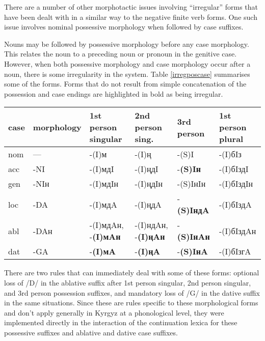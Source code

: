 \documentclass[10pt,a4paper,twocolumn]{article}
\begin{document}
There are a number of other morphotactic issues involving ``irregular'' forms that have been dealt with in a similar way to the negative finite verb forms.  One such issue involves nominal possessive morphology when followed by case suffixes.

Nouns may be followed by possessive morphology before any case morphology.  This relates the noun to a preceding noun or pronoun in the genitive case.  However, when both possessive morphology and case morphology occur after a noun, there is some irregularity in the system.  Table \ref{irregposcase} summarises some of the forms.  Forms that do not result from simple concatenation of the possession and case endings are highlighted in bold as being irregular.

\begin{table*}[htbp]
	\caption{Combinations of possessive suffixes with case suffixes}\label{irregposcase}
	\centering
	\begin{tabular}{llllll}
		\toprule
		case & morphology & 1st person singular & 2nd person sing. & 3rd person & 1st person plural \\
		\midrule
		nom & — & -(I)м & -(I)ң & -(S)I & -(I)бIз \\
		acc & -NI & -(I)мдI & -(I)ңдI & -\textbf{(S)Iн} & -(I)бIздI \\
		gen & -NIн & -(I)мдIн & -(I)ңдIн & -(S)IнIн & -(I)бIздIн \\
		loc & -DA & -(I)мдA & -(I)ңдA & -\textbf{(S)IндA} & -(I)бIздA \\
		abl & -DAн & -(I)мдAн, -\textbf{(I)мAн} & -(I)ндAн, -\textbf{(I)ңAн} & -\textbf{(S)IнAн} & -(I)бIздAн \\
		dat & -GA & -\textbf{(I)мA} & -\textbf{(I)ңA} & -\textbf{(S)IнA} & -(I)бIзгA \\
		\bottomrule
	\end{tabular}
\end{table*}

There are two rules that can immediately deal with some of these forms: optional loss of /D/ in the ablative suffix after 1st person singular, 2nd person singular, and 3rd person possession suffixes, and mandatory loss of /G/ in the dative suffix in the same situations.  Since these are rules specific to these morphological forms and don’t apply generally in Kyrgyz at a phonological level, they were implemented directly in the interaction of the continuation lexica for these possessive suffixes and ablative and dative case suffixes.
\end{document}
